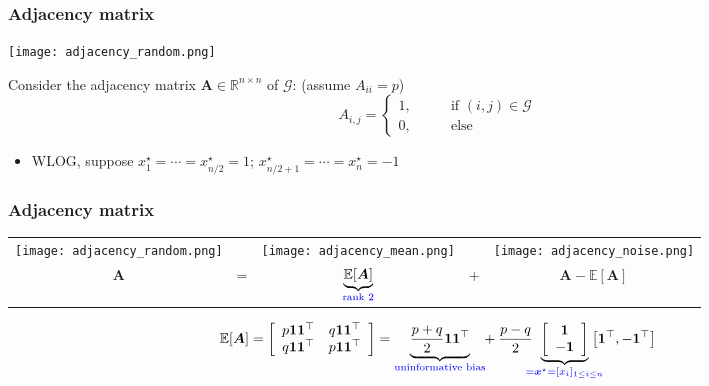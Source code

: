 \documentclass[compress,
mathserif,wide,%
]{beamer}
\begin{document}
\begin{frame}
\frametitle{Adjacency matrix}



\begin{center}
\texttt{[image: adjacency\_random.png]} 
\end{center}


Consider the adjacency matrix $\bm{A}\in \mathbb{R}^{n\times n}$ of $\mathcal{G}$: (assume $A_{ii} = p$)
%
\[
	A_{i,j} = \begin{cases}  1, \qquad & \text{if } (i,j) \in \mathcal{G} \\ 0, & \text{else} \end{cases}
\]

\vspace{-0.5em}
\begin{itemize}
	\item WLOG, suppose $x_1^{\star}=\cdots=x_{n/2}^{\star}=1$; $x_{n/2+1}^{\star}=\cdots=x_n^{\star}=-1$ 
\end{itemize}


\end{frame}




\begin{frame}
\frametitle{Adjacency matrix}


		
\begin{center}
\begin{tabular}{ccccc}
\texttt{[image: adjacency\_random.png]} &   & \texttt{[image: adjacency\_mean.png]} &  & \texttt{[image: adjacency\_noise.png]}\tabularnewline
	$\bm{A}$ & = & $\underset{\textcolor{blue}{ \text{rank 2}}}{\underbrace{\mathbb{E}[\bm{A}]}}$ & + & $\bm{A}-\mathbb{E}\left[\bm{A}\right]$\tabularnewline
\end{tabular}
\end{center}


{\small $$\mathbb{E}[\bm{A}]=\left[\begin{array}{cc}
p\bm{1}\bm{1}^{\top} & q\bm{1}\bm{1}^{\top}\\
q\bm{1}\bm{1}^{\top} & p\bm{1}\bm{1}^{\top}
\end{array}\right]=\underset{\textcolor{blue}{ \text{uninformative bias}}}{\underbrace{\frac{p+q}{2}\bm{1}\bm{1}^{\top}}} \hspace{-0.3em} +\frac{p-q}{2} \hspace{-0.5em}\underset{\textcolor{blue}{ =\bm{x}^{\star}=[x_i]_{1\leq i\leq n}}}{\underbrace{\left[\begin{array}{c}
\bm{1}\\
-\bm{1}
\end{array}\right]}} \hspace{-1em} \left[\bm{1}^{\top},-\bm{1}^{\top}\right]$$ }

		
\end{frame}
\end{document}
